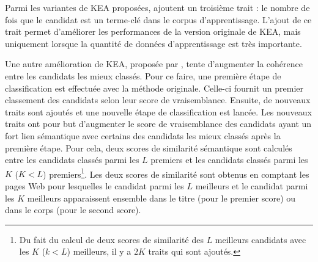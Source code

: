           Parmi les variantes de KEA proposées, 
          ajoutent un troisième trait : le nombre de fois que le candidat est un
          terme-clé dans le corpus d'apprentissage. L'ajout de ce trait permet
          d'améliorer les performances de la version originale de KEA, mais
          uniquement lorsque la quantité de données d'apprentissage est très
          importante.
          
          Une autre amélioration de KEA, proposée par
          , tente d'augmenter la cohérence entre
          les candidats les mieux classés. Pour ce faire, une première étape de
          classification est effectuée avec la méthode originale. Celle-ci
          fournit un premier classement des candidats selon leur score de
          vraisemblance. Ensuite, de nouveaux traits sont ajoutés et une
          nouvelle étape de classification est lancée. Les nouveaux traits ont
          pour but d'augmenter le score de vraisemblance des candidats ayant un
          fort lien sémantique avec certains des candidats les mieux classés
          après la première étape. Pour cela, deux scores de similarité
          sémantique sont calculés entre les candidats classés parmi les $L$
          premiers et les candidats classés parmi les $K$ ($K < L$)
          premiers\footnote{Du fait du calcul de deux scores de similarité des
          $L$ meilleurs candidats avec les $K$ ($k < L$) meilleurs, il y a $2K$
          traits qui sont ajoutés.}. Les deux scores de similarité sont obtenus
          en comptant les pages Web pour lesquelles le candidat parmi les $L$
          meilleurs et le candidat parmi les $K$ meilleurs apparaissent ensemble
          dans le titre (pour le premier score) ou dans le corps (pour le second
          score).

